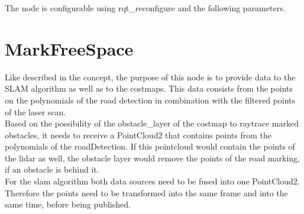 The node is configurable using rqt\_reconfigure and the following parameters.

\begin{table}[H]
\centering
{}

\caption{PoseFined parameters}
\label{posefinderparams}

\end{table}

\section{MarkFreeSpace}

Like described in the concept, the purpose of this node is to provide data to the SLAM algorithm as well as to the costmaps. This data consists from the points on the polynomials of the road detection in combination with the filtered points of the laser scan.\\

Based on the possibility of the obstacle\_layer of the costmap to raytrace marked obstacles, it needs to receive a PointCloud2 that contains points from the polynomials of the roadDetection. If this pointcloud would contain the points of the lidar as well, the obstacle layer would remove the points of the road marking, if an obstacle is behind it.\\

For the slam algorithm both data sources need to be fused into one PointCloud2. Therefore the points need to be transformed into the same frame and into the same time, before being published.\\

